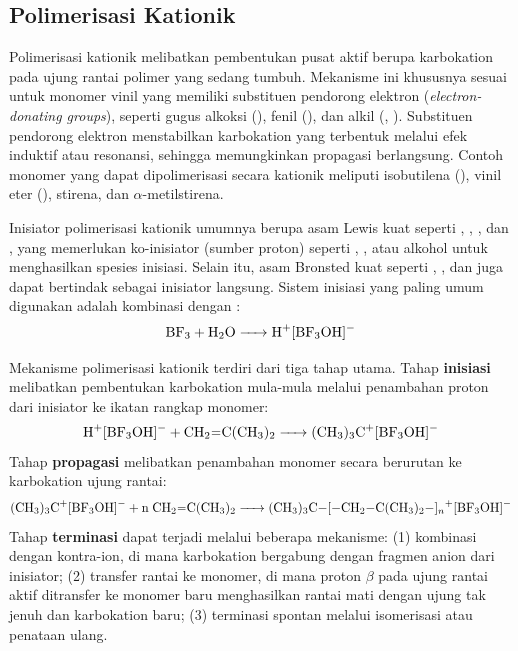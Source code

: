 \documentclass[12pt,a4paper,openany]{book}
\begin{document}
\subsection{Polimerisasi Kationik}

Polimerisasi kationik melibatkan pembentukan pusat aktif berupa karbokation pada ujung rantai polimer yang sedang tumbuh. Mekanisme ini khususnya sesuai untuk monomer vinil yang memiliki substituen pendorong elektron (\textit{electron-donating groups}), seperti gugus alkoksi (), fenil (), dan alkil (, ). Substituen pendorong elektron menstabilkan karbokation yang terbentuk melalui efek induktif atau resonansi, sehingga memungkinkan propagasi berlangsung. Contoh monomer yang dapat dipolimerisasi secara kationik meliputi isobutilena (), vinil eter (), stirena, dan $\alpha$-metilstirena.

Inisiator polimerisasi kationik umumnya berupa asam Lewis kuat seperti , , , dan , yang memerlukan ko-inisiator (sumber proton) seperti , , atau alkohol untuk menghasilkan spesies inisiasi. Selain itu, asam Bronsted kuat seperti , , dan  juga dapat bertindak sebagai inisiator langsung. Sistem inisiasi yang paling umum digunakan adalah kombinasi  dengan :
\begin{equation}
  \ce{BF3 + H2O -> H^+[BF3OH]^-}
\end{equation}

Mekanisme polimerisasi kationik terdiri dari tiga tahap utama. Tahap \textbf{inisiasi} melibatkan pembentukan karbokation mula-mula melalui penambahan proton dari inisiator ke ikatan rangkap monomer:
\begin{equation}
  \ce{H^+[BF3OH]^- + CH2=C(CH3)2 -> (CH3)3C^+[BF3OH]^-}
\end{equation}
Tahap \textbf{propagasi} melibatkan penambahan monomer secara berurutan ke karbokation ujung rantai:
\begin{equation}
  \ce{(CH3)3C^+[BF3OH]^- + n\;CH2=C(CH3)2 -> (CH3)3C-[-CH2-C(CH3)2-]_{n}^+[BF3OH]^-}
\end{equation}
Tahap \textbf{terminasi} dapat terjadi melalui beberapa mekanisme: (1) kombinasi dengan kontra-ion, di mana karbokation bergabung dengan fragmen anion dari inisiator; (2) transfer rantai ke monomer, di mana proton $\beta$ pada ujung rantai aktif ditransfer ke monomer baru menghasilkan rantai mati dengan ujung tak jenuh dan karbokation baru; (3) terminasi spontan melalui isomerisasi atau penataan ulang.
\end{document}
